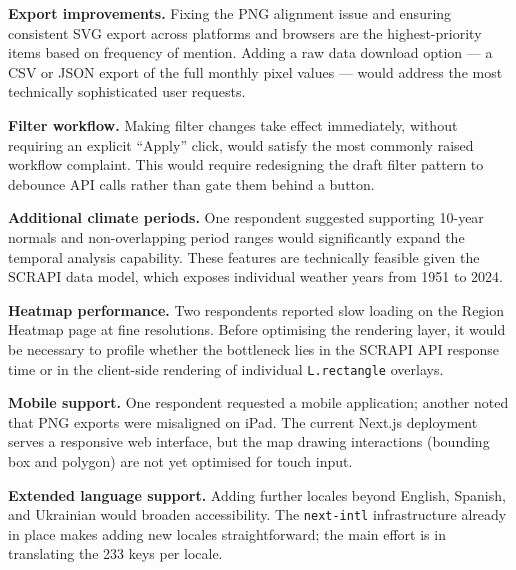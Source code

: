 \textbf{Export improvements.} Fixing the PNG alignment issue and ensuring
consistent SVG export across platforms and browsers are the highest-priority
items based on frequency of mention. Adding a raw data download option --- a
CSV or JSON export of the full monthly pixel values --- would address the most
technically sophisticated user requests.

\textbf{Filter workflow.} Making filter changes take effect immediately,
without requiring an explicit ``Apply'' click, would satisfy the most commonly
raised workflow complaint. This would require redesigning the draft filter
pattern to debounce API calls rather than gate them behind a button.

\textbf{Additional climate periods.} One respondent suggested supporting
10-year normals and non-overlapping period ranges would significantly expand
the temporal analysis capability. These features are technically feasible
given the SCRAPI data model, which exposes individual weather years from
1951 to 2024.

\textbf{Heatmap performance.} Two respondents reported slow loading on the
Region Heatmap page at fine resolutions. Before optimising the rendering
layer, it would be necessary to profile whether the bottleneck lies in the
SCRAPI API response time or in the client-side rendering of individual
\texttt{L.rectangle} overlays.

\textbf{Mobile support.} One respondent requested a mobile application;
another noted that PNG exports were misaligned on iPad. The current Next.js
deployment serves a responsive web interface, but the map drawing interactions
(bounding box and polygon) are not yet optimised for touch input.

\textbf{Extended language support.} Adding further locales beyond English,
Spanish, and Ukrainian would broaden accessibility. The \texttt{next-intl}
infrastructure already in place makes adding new locales straightforward;
the main effort is in translating the 233 keys per locale.